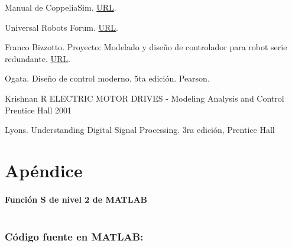 \documentclass{article}
\begin{document}
\begin{sloppypar}
Manual de CoppeliaSim.
\href{https://manual.coppeliarobotics.com/}{URL}.

Universal Robots Forum.
\href{https://forum.universal-robots.com/}{URL}.

Franco Bizzotto. Proyecto: Modelado y diseño de controlador para robot serie redundante.
\href{https://github.com/carloshernangarrido/control/blob/master/12_anteproyecto_proyecto-final/Bizzotto_Robot-serie.pdf}{URL}.

Ogata. Diseño de control moderno. 5ta edición. Pearson.

Krishnan R ELECTRIC MOTOR DRIVES - Modeling Analysis and Control Prentice Hall 2001

Lyons. Understanding Digital Signal Processing. 3ra edición, Prentice Hall



\printbibliography%


\section*{Apéndice}

\paragraph*{Función S de nivel 2 de MATLAB}
\label{sec:Función S de nivel 2 de MATLAB}
\hfill

\inputminted{matlab}{SIMULACION_CoppeliaSim.m}


\subsubsection*{Código fuente en MATLAB:}
\label{sec:Código fuente en MATLAB:}
\hfill

\inputminted{matlab}{Codigo.m}






\end{sloppypar}
\end{document}
